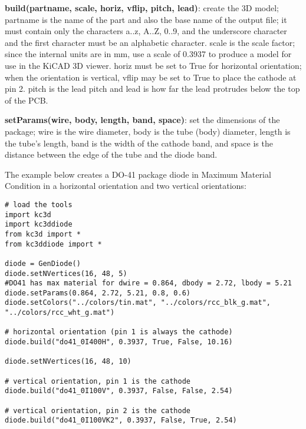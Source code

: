 \textbf{build(partname, scale, horiz, vflip, pitch, lead)}: create the
3D model; partname is the name of the part and also the base name of the
output file; it must contain only the characters a..z, A..Z, 0..9, and the 
underscore character and the first character must be an alphabetic character.
scale is the scale factor; since the internal units are in mm, use a scale of
0.3937 to produce a model for use in the KiCAD 3D viewer. horiz must be set to
True for horizontal orientation; when the orientation is vertical, vflip may
be set to True to place the cathode at pin 2. pitch is the lead pitch and
lead is how far the lead protrudes below the top of the PCB.

\textbf{setParams(wire, body, length, band, space)}: set the dimensions of the
package; wire is the wire diameter, body is the tube (body) diameter, length
is the tube's length, band is the width of the cathode band, and space is the
distance between the edge of the tube and the diode band.

The example below creates a DO-41 package diode in Maximum Material Condition
in a horizontal orientation and two vertical orientations:

\begin{verbatim}
# load the tools
import kc3d
import kc3ddiode
from kc3d import *
from kc3ddiode import *

diode = GenDiode()
diode.setNVertices(16, 48, 5)
#DO41 has max material for dwire = 0.864, dbody = 2.72, lbody = 5.21
diode.setParams(0.864, 2.72, 5.21, 0.8, 0.6)
diode.setColors("../colors/tin.mat", "../colors/rcc_blk_g.mat", "../colors/rcc_wht_g.mat")

# horizontal orientation (pin 1 is always the cathode)
diode.build("do41_0I400H", 0.3937, True, False, 10.16)

diode.setNVertices(16, 48, 10)

# vertical orientation, pin 1 is the cathode
diode.build("do41_0I100V", 0.3937, False, False, 2.54)

# vertical orientation, pin 2 is the cathode
diode.build("do41_0I100VK2", 0.3937, False, True, 2.54)
\end{verbatim}
